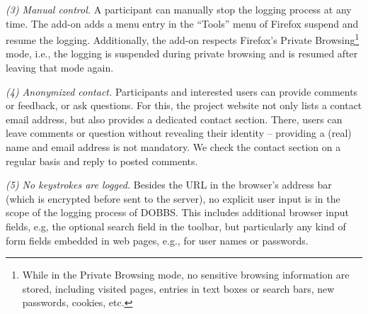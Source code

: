 \documentclass[11pt,fleqn,twoside]{article}
\begin{document}
\textit{(3) Manual control.}
A participant can manually stop the logging process at any time. The add-on adds a menu entry in the ``Tools'' menu of Firefox suspend and resume the logging. Additionally, the add-on respects Firefox's Private Browsing\footnote{While in the Private Browsing mode, no sensitive browsing information are stored, including visited pages, entries in text boxes or search bars, new passwords, cookies, etc.} mode, i.e., the logging is suspended during private browsing and is resumed after leaving that mode again.

\textit{(4) Anonymized contact.}
Participants and interested users can provide comments or feedback, or ask questions. For this, the project website not only lists a contact email address, but also provides a dedicated contact section. There, users can leave comments or question without revealing their identity -- providing a (real) name and email address is not mandatory. We check the contact section on a regular basis and reply to posted comments.

\textit{(5) No keystrokes are logged.} Besides the URL in the browser's address bar (which is encrypted before sent to the server), no explicit user input is in the scope of the logging process of DOBBS. This includes additional browser input fields, e.g, the optional search field in the toolbar, but particularly any kind of form fields embedded in web pages, e.g., for user names or passwords.
\end{document}
